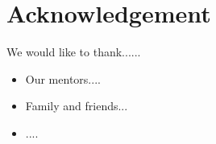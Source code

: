 \section*{Acknowledgement}
We would like to thank......

\begin{itemize}
    \item Our mentors....
    \item Family and friends...
    \item ....
\end{itemize}